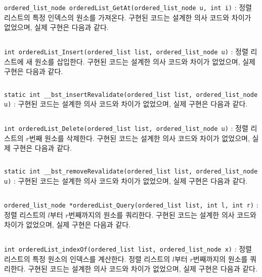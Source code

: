 \inputminted[xleftmargin=\parindent,linenos,firstline=199,lastline=207]{c}{inc-sources/ordered-list.c}

\texttt{ordered_list_node orderedList_GetAt(ordered_list_node u, int i)}
: 정렬 리스트의 특정 인덱스의 원소를 가져온다. 구현된 코드는 설계한 의사 코드와 차이가 없었으며, 실제 구현은 다음과 같다.

\inputminted[xleftmargin=\parindent,linenos,firstline=199,lastline=207]{c}{inc-sources/ordered-list.c}

\texttt{int orderedList_Insert(ordered_list list, ordered_list_node u)}
: 정렬 리스트에 새 원소를 삽입한다. 구현된 코드는 설계한 의사 코드와 차이가 없었으며, 실제 구현은 다음과 같다.

\inputminted[xleftmargin=\parindent,linenos,firstline=60,lastline=92]{c}{inc-sources/ordered-list.c}

\texttt{static int __bst_insertRevalidate(ordered_list list, ordered_list_node u)}
: 구현된 코드는 설계한 의사 코드와 차이가 없었으며, 실제 구현은 다음과 같다.

\inputminted[xleftmargin=\parindent,linenos,firstline=276,lastline=316]{c}{inc-sources/ordered-list.c}

\texttt{int orderedList_Delete(ordered_list list, ordered_list_node u)}
: 정렬 리스트의 $r$번째 원소를 삭제한다. 구현된 코드는 설계한 의사 코드와 차이가 없었으며, 실제 구현은 다음과 같다.

\inputminted[xleftmargin=\parindent,linenos,firstline=94,lastline=145]{c}{inc-sources/ordered-list.c}

\texttt{static int __bst_removeRevalidate(ordered_list list, ordered_list_node u)}
: 구현된 코드는 설계한 의사 코드와 차이가 없었으며, 실제 구현은 다음과 같다.

\inputminted[xleftmargin=\parindent,linenos,firstline=318,lastline=371]{c}{inc-sources/ordered-list.c}

\texttt{ordered_list_node *orderedList_Query(ordered_list list, int l, int r)}
: 정렬 리스트의 $l$부터 $r$번째까지의 원소를 쿼리한다. 구현된 코드는 설계한 의사 코드와 차이가 없었으며, 실제 구현은 다음과 같다.

\inputminted[xleftmargin=\parindent,linenos,firstline=147,lastline=179]{c}{inc-sources/ordered-list.c}

\texttt{int orderedList_indexOf(ordered_list list, ordered_list_node x)}
: 정렬 리스트의 특정 원소의 인덱스를 계산한다. 정렬 리스트의 $l$부터 $r$번째까지의 원소를 쿼리한다. 구현된 코드는 설계한 의사 코드와 차이가 없었으며, 실제 구현은 다음과 같다.


